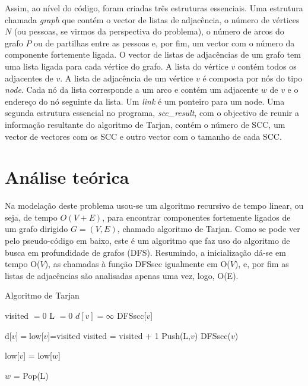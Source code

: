 \documentclass[12pt]{article}
\begin{document}
Assim, ao nível do código, foram criadas três estruturas essenciais.
Uma estrutura chamada \emph{graph} que contém o vector de listas de adjacência, o número de vértices $N$ (ou pessoas, se virmos da perspectiva do problema), o número de arcos do grafo $P$ ou de partilhas entre as pessoas e, por fim, um vector com o número da componente fortemente ligada. 
O vector de listas de adjacências de um grafo tem uma lista ligada para cada vértice do grafo. A lista do vértice $v$ contém todos os adjacentes de $v$.
A lista de adjacência de um vértice $v$ é composta por nós do tipo \emph{node}. Cada nó da lista corresponde a um arco e contém um adjacente $w$ de $v$ e o endereço do nó seguinte da lista. Um \emph{link} é um ponteiro para um node.
Uma segunda estrutura essencial no programa, \emph{scc\_result}, com o objectivo de reunir a informação resultante do algoritmo de Tarjan, contém o número de SCC, um vector de vectores com os SCC e outro vector com o tamanho de cada SCC.

\section*{Análise teórica}

Na modelação deste problema usou-se um algoritmo recursivo de tempo linear, ou seja, de tempo $O(V+E)$, para encontrar componentes fortemente ligados de um grafo dirigido $G = (V,E)$, chamado algoritmo de Tarjan. Como se pode ver pelo pseudo-código em baixo, este é um algoritmo que faz uso do algoritmo de busca em profundidade de grafos (DFS). Resumindo, a inicialização dá-se em tempo O($V$), as chamadas à função DFSscc igualmente em O($V$), e, por fim as listas de adjacências são analisadas apenas uma vez, logo, O(E). 

\begin{algorithm}
\caption{Algoritmo de Tarjan}
\begin{algorithmic}[1]
    \State visited $=0$
    \State L $=0$
      \State $d[v] = \infty$
   \EndFor
           \State DFSscc[$v$]
        \EndIf
   \EndFor
\EndProcedure
\Statex        
        
    \State d[$v]=$low[$v$]=visited
    \State visited = visited + 1
    \State Push(L,$v$)
           \State DFSscc($v$)
        \EndIf
        
            \State low[$v$] = low[$w$]
        \EndIf
    \EndFor
    
    
        \Repeat
             \State $w$ = Pop(L)
    \EndIf
    
\EndProcedure
\end{algorithmic}
\end{algorithm}
\end{document}
